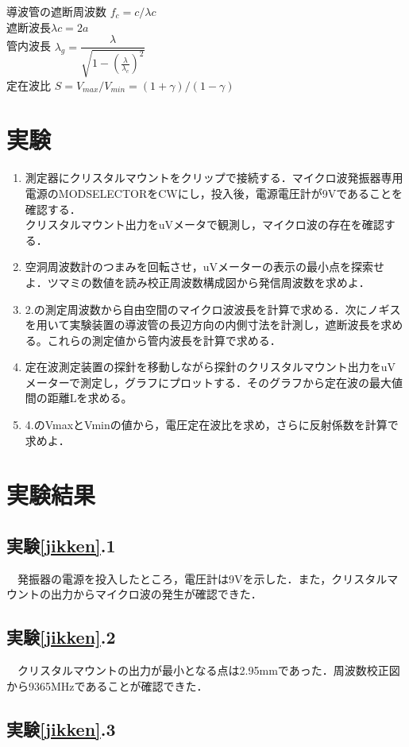 導波管の遮断周波数 $f_c=c/\lambda c$\\
遮断波長$\lambda c = 2a$\\
管内波長 $\lambda_g = \dfrac{\lambda}{\sqrt{1-(\frac{\lambda}{\lambda_c})^2}}$\\
定在波比 $S=V_{max}/V_{min}=(1+\gamma)/(1-\gamma)$\\

\section{実験\label{jikken}}
\begin{enumerate}
    \item 測定器にクリスタルマウントをクリップで接続する．マイクロ波発振器専用電源のMODSELECTORをCWにし，投入後，電源電圧計が9Vであることを確認する．\\
    クリスタルマウント出力をuVメータで観測し，マイクロ波の存在を確認する．\\

    \item 空洞周波数計のつまみを回転させ，uVメーターの表示の最小点を探索せよ．ツマミの数値を読み校正周波数構成図から発信周波数を求めよ．\\

    \item 2.の測定周波数から自由空間のマイクロ波波長を計算で求める．次にノギスを用いて実験装置の導波管の長辺方向の内側寸法を計測し，遮断波長を求める。これらの測定値から管内波長を計算で求める．\\

    \item 定在波測定装置の探針を移動しながら探針のクリスタルマウント出力をuVメーターで測定し，グラフにプロットする．そのグラフから定在波の最大値間の距離Lを求める。\\

    \item 4.のVmaxとVminの値から，電圧定在波比を求め，さらに反射係数を計算で求めよ．\\
  \end{enumerate}


\newpage


\section{実験結果}
\subsection{実験\ref{jikken}.1}
　発振器の電源を投入したところ，電圧計は9Vを示した．また，クリスタルマウントの出力からマイクロ波の発生が確認できた．

\subsection{実験\ref{jikken}.2}
　クリスタルマウントの出力が最小となる点は2.95mmであった．周波数校正図から9365MHzであることが確認できた．

\subsection{実験\ref{jikken}.3}




